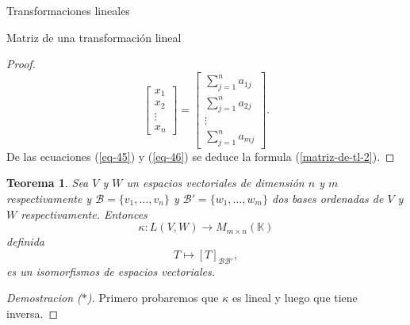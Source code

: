 \documentclass[a4paper,12pt,twoside,spanish,reqno]{amsbook}
\numberwithin{equation}{section}
\newtheorem{teorema}{Teorema}[section]
\theoremstyle{definition}
\theoremstyle{remark}
\newcommand{\K}{\mathbb K}
\begin{document}
\begin{chapter}{Transformaciones lineales}
\begin{section}{Matriz de una transformación lineal}
\begin{proof}
\begin{equation}
            \begin{bmatrix} x_1\\x_2\\ \vdots\\x_n\end{bmatrix}
            =
            \begin{bmatrix}  \sum_{j=1}^{n}a_{1j}\\\sum_{j=1}^{n}a_{2j}\\ \vdots\\\sum_{j=1}^{n}a_{mj}\end{bmatrix}.
            \end{equation}
            De las ecuaciones (\ref{eq-45}) y (\ref{eq-46}) se deduce la formula (\ref{matriz-de-tl-2}).
        \end{proof}
        
        \begin{teorema}
            Sea $V$  y $W$ un espacios vectoriales de dimensión $n$ y $m$ respectivamente y $\mathcal B = \{v_1,\ldots,v_n\}$ y $\mathcal B' = \{w_1,\ldots,w_m\}$ dos bases  ordenadas de $V$ y $W$ respectivamente. Entonces 
            $$
            \kappa: L(V,W) \to M_{m \times n}(\K)
            $$
            definida
            $$
            T \mapsto [T]_{\mathcal B \mathcal B'},
            $$
            es un isomorfismos de espacios vectoriales. 
        \end{teorema}
        \begin{proof}[Demostracion ($*$)]
            Primero probaremos que $\kappa$  es lineal y luego que tiene inversa.
            

\end{proof}
\end{section}
\end{chapter}
\end{document}
